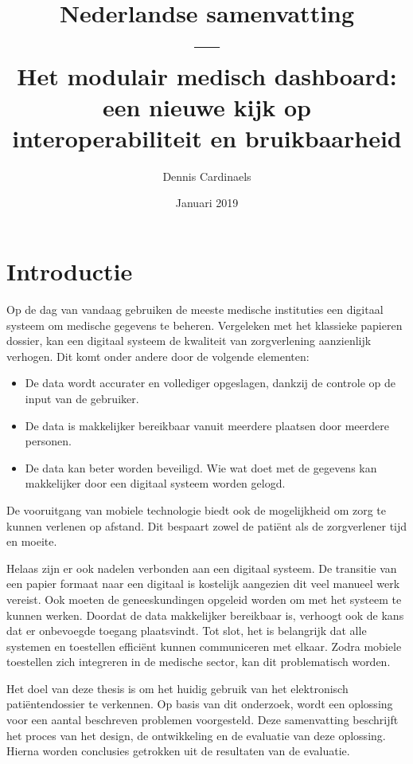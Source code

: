 \documentclass{article}
\title{Nederlandse samenvatting\\---\\Het modulair medisch dashboard: een nieuwe kijk op interoperabiliteit en bruikbaarheid}
\date{Januari 2019}
\author{Dennis Cardinaels}
\begin{document}
\maketitle

\tableofcontents
\newpage

\section{Introductie}

Op de dag van vandaag gebruiken de meeste medische instituties een digitaal systeem om medische gegevens te beheren. Vergeleken met het klassieke papieren dossier, kan een digitaal systeem de kwaliteit van zorgverlening aanzienlijk verhogen. Dit komt onder andere door de volgende elementen:
\begin{itemize}
    \item De data wordt accurater en vollediger opgeslagen, dankzij de controle op de input van de gebruiker.
    \item De data is makkelijker bereikbaar vanuit meerdere plaatsen door meerdere personen.
    \item De data kan beter worden beveiligd. Wie wat doet met de gegevens kan makkelijker door een digitaal systeem worden gelogd.
\end{itemize}

\noindent De vooruitgang van mobiele technologie biedt ook de mogelijkheid om zorg te kunnen verlenen op afstand. Dit bespaart zowel de pati\"{e}nt als de zorgverlener tijd en moeite. 

Helaas zijn er ook nadelen verbonden aan een digitaal systeem. De transitie van een papier formaat naar een digitaal is kostelijk aangezien dit veel manueel werk vereist. Ook moeten de geneeskundingen opgeleid worden om met het systeem te kunnen werken. Doordat de data makkelijker bereikbaar is, verhoogt ook de kans dat er onbevoegde toegang plaatsvindt. Tot slot, het is belangrijk dat alle systemen en toestellen effici\"{e}nt kunnen communiceren met elkaar. Zodra mobiele toestellen zich integreren in de medische sector, kan dit problematisch worden.

Het doel van deze thesis is om het huidig gebruik van het elektronisch pati\"{e}ntendossier te verkennen. Op basis van dit onderzoek, wordt een oplossing voor een aantal beschreven problemen voorgesteld. Deze samenvatting beschrijft het proces van het design, de ontwikkeling en de evaluatie van deze oplossing. Hierna worden conclusies getrokken uit de resultaten van de evaluatie.
\end{document}
